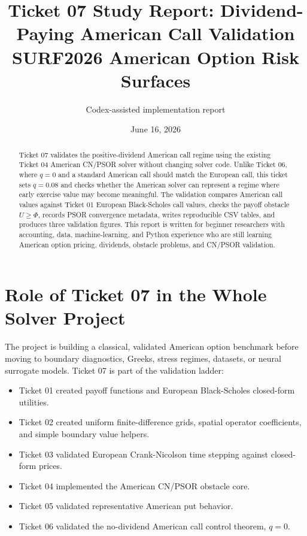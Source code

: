 \documentclass[11pt,a4paper]{article}
\title{\textbf{Ticket 07 Study Report: Dividend-Paying American Call Validation}\\
\large SURF2026 American Option Risk Surfaces}
\author{Codex-assisted implementation report}
\date{June 16, 2026}
\begin{document}
\maketitle

\begin{abstract}
Ticket 07 validates the positive-dividend American call regime using the existing Ticket 04
American CN/PSOR solver without changing solver code. Unlike Ticket 06, where \(q=0\) and a
standard American call should match the European call, this ticket sets \(q=0.08\) and checks
whether the American solver can represent a regime where early exercise value may become
meaningful. The validation compares American call values against Ticket 01 European
Black-Scholes call values, checks the payoff obstacle \(U\geq\Phi\), records PSOR convergence
metadata, writes reproducible CSV tables, and produces three validation figures. This report is
written for beginner researchers with accounting, data, machine-learning, and Python experience
who are still learning American option pricing, dividends, obstacle problems, and CN/PSOR
validation.
\end{abstract}

\tableofcontents
\newpage

\section{Role of Ticket 07 in the Whole Solver Project}

The project is building a classical, validated American option benchmark before moving to
boundary diagnostics, Greeks, stress regimes, datasets, or neural surrogate models. Ticket 07 is
part of the validation ladder:
\begin{itemize}
  \item Ticket 01 created payoff functions and European Black-Scholes closed-form utilities.
  \item Ticket 02 created uniform finite-difference grids, spatial operator coefficients, and
        simple boundary value helpers.
  \item Ticket 03 validated European Crank-Nicolson time stepping against closed-form prices.
  \item Ticket 04 implemented the American CN/PSOR obstacle core.
  \item Ticket 05 validated representative American put behavior.
  \item Ticket 06 validated the no-dividend American call control theorem, \(q=0\).
\end{itemize}
\end{document}

